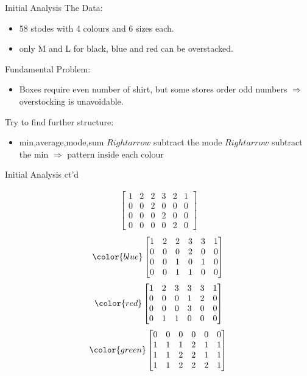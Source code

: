 \begin{frame}{Initial Analysis}
	The Data:
	\begin{itemize}
		\item 58 stodes with 4 colours and 6 sizes each.
		\item only M and L for black, blue and red can be overstacked.
	\end{itemize}
	Fundamental Problem:
	\begin{itemize}
		\item Boxes require even number of shirt, but some stores order odd numbers $\Rightarrow$ overstocking is unavoidable.
	\end{itemize}
	Try to find further structure:
	\begin{itemize}
		\item min,average,mode,sum $Rightarrow$ subtract the mode $Rightarrow$ subtract the min $\Rightarrow$ pattern inside each colour
	\end{itemize}
\end{frame}
\begin{frame}{Initial Analysis ct'd}

\begin{align*}
    \begin{bmatrix}
    1&2&2&3&2&1\\
    0&0&2&0&0&0\\
    0&0&0&2&0&0\\
    0&0&0&0&2&0
    \end{bmatrix}
\end{align*}
\begin{align*}
\color{blue}
    \begin{bmatrix}
        1&2&2&3&3&1\\
        0&0&0&2&0&0\\
        0&0&1&0&1&0\\
        0&0&1&1&0&0\\
    \end{bmatrix}
\end{align*}
\begin{align*}
\color{red}
    \begin{bmatrix}
         1&2&3&3&3&1\\
         0&0&0&1&2&0\\
         0&0&0&3&0&0\\
         0&1&1&0&0&0\\
    \end{bmatrix}
\end{align*}
\begin{align*}
\color{green}
    \begin{bmatrix}
         0&0&0&0&0&0\\
         1&1&1&2&1&1\\
         1&1&2&2&1&1\\
         1&1&2&2&2&1\\
    \end{bmatrix}
\end{align*}
\end{frame}


